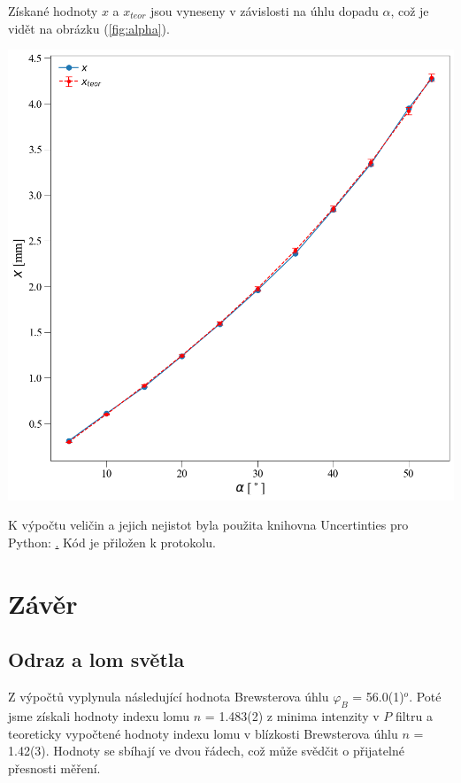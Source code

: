 \documentclass[a4paper,11pt]{article}
\begin{document}
    \hspace{10pt}
    \begin{minipage}[t]{0.5\textwidth} 
                Získané hodnoty $x$ a $x_{teor}$ jsou vyneseny v závislosti na úhlu dopadu $\alpha$, což je vidět na obrázku (\ref{fig:alpha}). 
                \par \centering
                \includegraphics[scale=0.3]{alpha}
                \captionsetup{justification=centering, font=footnotesize}
                \label{fig:alpha}
                \vspace{10pt}
                \raggedright
                \vspace{10pt}
                \par K výpočtu veličin a jejich nejistot byla použita knihovna Uncertinties pro Python: \href{pypi.org/project/uncertainties}. Kód je přiložen k protokolu. 
        \section{Závěr}  
            \subsection{Odraz a lom světla}
                Z výpočtů vyplynula následující hodnota Brewsterova úhlu $\varphi_B$ = 56.0(1)$^o$. Poté jsme získali hodnoty indexu lomu $n$ = 1.483(2) z minima intenzity v $P$ filtru a teoreticky vypočtené hodnoty indexu lomu v blízkosti Brewsterova úhlu $n$ = 1.42(3). Hodnoty se sbíhají ve dvou řádech, což může svědčit o přijatelné přesnosti měření. 

\end{minipage}
\end{document}
